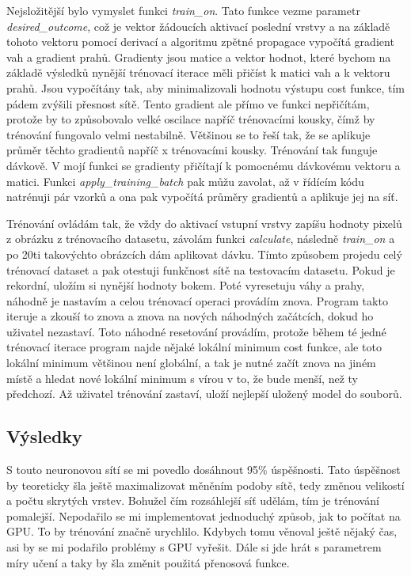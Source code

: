 \documentclass[a4paper,11pt, oneside]{book} \usepackage[czech]{babel}
\begin{document}
	Nejsložitější bylo vymyslet funkci \textit{train\_on}. Tato funkce vezme parametr \textit{desired\_outcome},
	což je vektor žádoucích aktivací poslední vrstvy a na základě tohoto vektoru
	pomocí derivací a algoritmu zpětné propagace vypočítá gradient
	vah a gradient prahů. Gradienty jsou matice a vektor hodnot, které bychom na základě výsledků nynější
	trénovací iterace měli přičíst k matici vah a k vektoru prahů. Jsou vypočítány tak, aby
	minimalizovali hodnotu výstupu cost funkce, tím pádem zvýšili přesnost sítě.
	Tento gradient ale přímo ve funkci  nepřičítám, protože by to způsobovalo velké oscilace
	napříč trénovacími kousky, čímž by
	trénování fungovalo velmi nestabilně. Většinou se to řeší tak, že se aplikuje
	průměr těchto gradientů napříč x trénovacími kousky. Trénování tak funguje dávkově.
	V mojí funkci se gradienty přičítají k pomocnému dávkovému vektoru a matici.
	Funkci \textit{apply\_training\_batch} pak můžu zavolat, až v řídícím kódu
	natrénuji pár vzorků a ona pak vypočítá průměry gradientů a aplikuje jej na síť.

	Trénování ovládám tak, že vždy do aktivací vstupní vrstvy zapíšu hodnoty
	pixelů z obrázku z trénovacího datasetu, závolám funkci \textit{calculate}, následně
	\textit{train\_on} a po 20ti takovýchto obrázcích dám aplikovat dávku.
	Tímto způsobem projedu celý trénovací dataset a pak otestuji funkčnost sítě na
	testovacím datasetu. Pokud je rekordní, uložím si nynější hodnoty bokem. Poté vyresetuju
	váhy a prahy, náhodně je nastavím a celou trénovací operaci provádím znova.
	Program takto iteruje a zkouší to znova a znova na nových náhodných začátcích, dokud ho uživatel
	nezastaví. Toto náhodné resetování provádím, protože během té jedné trénovací iterace program najde
	nějaké lokální minimum cost funkce, ale toto lokální minimum většinou není globální, a tak je
	nutné začít znova na jiném místě a hledat nové lokální minimum s vírou v to, že bude menší, než
	ty předchozí. Až uživatel trénování zastaví, uloží nejlepší uložený model do souborů.

	\subsection{Výsledky}

	S touto neuronovou sítí se mi povedlo dosáhnout 95\% úspěšnosti. Tato úspěšnost by teoreticky
	šla ještě maximalizovat měněním podoby sítě, tedy změnou velikostí a počtu skrytých vrstev.
	Bohužel čím rozsáhlejší síť udělám, tím je trénování pomalejší. Nepodařilo se mi
	implementovat jednoduchý způsob, jak to počítat na GPU. To by trénování značně urychlilo.
	Kdybych tomu věnoval ještě nějaký čas, asi by se mi podařilo problémy s GPU vyřešit.
	Dále si jde hrát s parametrem míry učení a taky by šla změnit použitá přenosová funkce.
\end{document}
